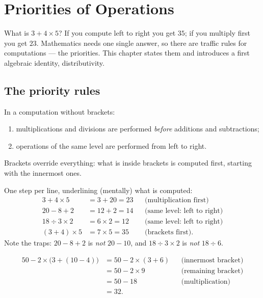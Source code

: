 \chapter{Priorities of Operations}\label{ch:g7:priorities}

What is $3 + 4 \times 5$? If you compute left to right you get $35$;
if you multiply first you get $23$. Mathematics needs one single
answer, so there are traffic rules for computations --- the priorities.
This chapter states them and introduces a first algebraic identity,
distributivity.

\section{The priority rules}

\begin{theorem}\label{thm:g7:priorities:rules}
In a computation without brackets:
\begin{enumerate}
  \item multiplications and divisions are performed \emph{before}
        additions and subtractions;
  \item operations of the same level are performed from left to right.
\end{enumerate}
Brackets override everything: what is inside brackets is computed
first, starting with the innermost ones.
\end{theorem}

\begin{example}\label{ex:g7:priorities:basic}
One step per line, underlining (mentally) what is computed:
\begin{align*}
3 + 4 \times 5 &= 3 + 20 = 23
&&\text{(multiplication first)}\\
20 - 8 + 2 &= 12 + 2 = 14
&&\text{(same level: left to right)}\\
18 \div 3 \times 2 &= 6 \times 2 = 12
&&\text{(same level: left to right)}\\
(3 + 4) \times 5 &= 7 \times 5 = 35
&&\text{(brackets first).}
\end{align*}
Note the traps: $20 - 8 + 2$ is \emph{not} $20 - 10$, and
$18 \div 3 \times 2$ is \emph{not} $18 \div 6$.
\end{example}

\begin{example}\label{ex:g7:priorities:nested}
\begin{align*}
50 - 2 \times \bigl(3 + (10 - 4)\bigr)
&= 50 - 2 \times (3 + 6) && \text{(innermost bracket)}\\
&= 50 - 2 \times 9 && \text{(remaining bracket)}\\
&= 50 - 18 && \text{(multiplication)}\\
&= 32 .
\end{align*}
\end{example}

